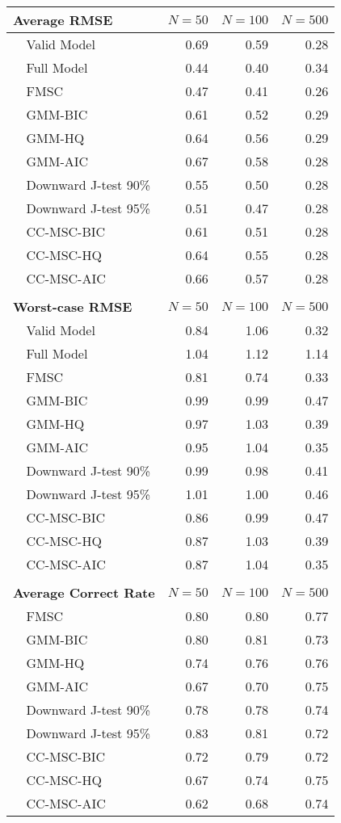 \documentclass{article}
\begin{document}
%
\begin{table}[!tbp]
 \begin{center}
 \begin{tabular}{rlrrr}\hline\hline
\multicolumn{2}{l}{\textbf{Average RMSE}}&\multicolumn{1}{c}{$N=50$}&\multicolumn{1}{c}{$N=100$}&\multicolumn{1}{c}{$N=500$}\tabularnewline
\hline
&Valid Model&0.69&0.59&0.28\tabularnewline
&Full Model&0.44&0.40&0.34\tabularnewline
&FMSC&0.47&0.41&0.26\tabularnewline
&GMM-BIC&0.61&0.52&0.29\tabularnewline
&GMM-HQ&0.64&0.56&0.29\tabularnewline
&GMM-AIC&0.67&0.58&0.28\tabularnewline
&Downward J-test 90\%&0.55&0.50&0.28\tabularnewline
&Downward J-test 95\%&0.51&0.47&0.28\tabularnewline
&CC-MSC-BIC&0.61&0.51&0.28\tabularnewline
&CC-MSC-HQ&0.64&0.55&0.28\tabularnewline
&CC-MSC-AIC&0.66&0.57&0.28\tabularnewline
\\
\multicolumn{2}{l}{\textbf{Worst-case RMSE}}&\multicolumn{1}{c}{$N=50$}&\multicolumn{1}{c}{$N=100$}&\multicolumn{1}{c}{$N=500$}\tabularnewline
\hline
&Valid Model&0.84&1.06&0.32\tabularnewline
&Full Model&1.04&1.12&1.14\tabularnewline
&FMSC&0.81&0.74&0.33\tabularnewline
&GMM-BIC&0.99&0.99&0.47\tabularnewline
&GMM-HQ&0.97&1.03&0.39\tabularnewline
&GMM-AIC&0.95&1.04&0.35\tabularnewline
&Downward J-test 90\%&0.99&0.98&0.41\tabularnewline
&Downward J-test 95\%&1.01&1.00&0.46\tabularnewline
&CC-MSC-BIC&0.86&0.99&0.47\tabularnewline
&CC-MSC-HQ&0.87&1.03&0.39\tabularnewline
&CC-MSC-AIC&0.87&1.04&0.35\tabularnewline
\\
\multicolumn{2}{l}{\textbf{Average Correct Rate}}&\multicolumn{1}{c}{$N=50$}&\multicolumn{1}{c}{$N=100$}&\multicolumn{1}{c}{$N=500$}\tabularnewline
\hline
&FMSC&0.80&0.80&0.77\tabularnewline
&GMM-BIC&0.80&0.81&0.73\tabularnewline
&GMM-HQ&0.74&0.76&0.76\tabularnewline
&GMM-AIC&0.67&0.70&0.75\tabularnewline
&Downward J-test 90\%&0.78&0.78&0.74\tabularnewline
&Downward J-test 95\%&0.83&0.81&0.72\tabularnewline
&CC-MSC-BIC&0.72&0.79&0.72\tabularnewline
&CC-MSC-HQ&0.67&0.74&0.75\tabularnewline
&CC-MSC-AIC&0.62&0.68&0.74\tabularnewline
\hline
\end{tabular}

\end{center}

\end{table}
\end{document}
